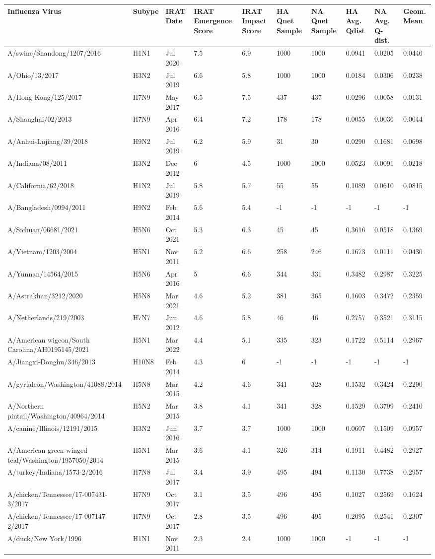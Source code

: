 \begin{tabular}{L{1.9in}|L{.35in}|L{.35in}|L{.35in}|L{.35in}|L{.35in}|L{.35in}|L{.35in}|L{.35in}|L{.35in}}\hline
Influenza Virus & Subype & IRAT Date &IRAT Emergence Score &IRAT Impact Score &HA Qnet Sample &NA Qnet Sample &HA Avg. Qdist &NA Avg. Q-dist. &Geom. Mean \\\hline
 A/swine/Shandong/1207/2016 &H1N1& Jul  2020 &7.5&6.9&1000&1000&0.0941&0.0205&0.0440\\\hline
 A/Ohio/13/2017 &H3N2& Jul  2019 &6.6&5.8&1000&1000&0.0184&0.0306&0.0238\\\hline
 A/Hong  Kong/125/2017 &H7N9& May  2017 &6.5&7.5&437&437&0.0296&0.0058&0.0131\\\hline
 A/Shanghai/02/2013 &H7N9& Apr  2016 &6.4&7.2&178&178&0.0055&0.0036&0.0044\\\hline
 A/Anhui-Lujiang/39/2018 &H9N2& Jul  2019 &6.2&5.9&31&30&0.0290&0.1681&0.0698\\\hline
 A/Indiana/08/2011 &H3N2& Dec  2012 &6&4.5&1000&1000&0.0523&0.0091&0.0218\\\hline
 A/California/62/2018 &H1N2& Jul  2019 &5.8&5.7&55&55&0.1089&0.0610&0.0815\\\hline
 A/Bangladesh/0994/2011 &H9N2& Feb  2014 &5.6&5.4&-1&-1&-1&-1&-1\\\hline
 A/Sichuan/06681/2021 &H5N6& Oct  2021 &5.3&6.3&45&45&0.3616&0.0518&0.1369\\\hline
 A/Vietnam/1203/2004 &H5N1& Nov  2011 &5.2&6.6&258&246&0.1673&0.0111&0.0430\\\hline
 A/Yunnan/14564/2015 &H5N6& Apr  2016 &5&6.6&344&331&0.3482&0.2987&0.3225\\\hline
 A/Astrakhan/3212/2020 &H5N8& Mar  2021 &4.6&5.2&381&365&0.1603&0.3472&0.2359\\\hline
 A/Netherlands/219/2003 &H7N7& Jun  2012 &4.6&5.8&46&46&0.2757&0.3521&0.3115\\\hline
 A/American  wigeon/South  Carolina/AH0195145/2021 &H5N1& Mar  2022 &4.4&5.1&335&323&0.1722&0.5114&0.2967\\\hline
 A/Jiangxi-Donghu/346/2013 &H10N8& Feb  2014 &4.3&6&-1&-1&-1&-1&-1\\\hline
 A/gyrfalcon/Washington/41088/2014 &H5N8& Mar  2015 &4.2&4.6&341&328&0.1532&0.3424&0.2290\\\hline
 A/Northern  pintail/Washington/40964/2014 &H5N2& Mar  2015 &3.8&4.1&341&328&0.1529&0.3799&0.2410\\\hline
 A/canine/Illinois/12191/2015 &H3N2& Jun  2016 &3.7&3.7&1000&1000&0.0607&0.1509&0.0957\\\hline
 A/American  green-winged  teal/Washington/1957050/2014 &H5N1& Mar 2015 &3.6&4.1&326&314&0.1911&0.4482&0.2927\\\hline
 A/turkey/Indiana/1573-2/2016 &H7N8& Jul  2017 &3.4&3.9&495&494&0.1130&0.7738&0.2957\\\hline
 A/chicken/Tennessee/17-007431-3/2017 &H7N9& Oct  2017 &3.1&3.5&496&495&0.1027&0.2569&0.1624\\\hline
 A/chicken/Tennessee/17-007147-2/2017 &H7N9& Oct  2017 &2.8&3.5&496&495&0.2095&0.2541&0.2307\\\hline
 A/duck/New  York/1996 &H1N1& Nov  2011 &2.3&2.4&1000&1000&-1&-1&-1\\\hline
 \end{tabular}

